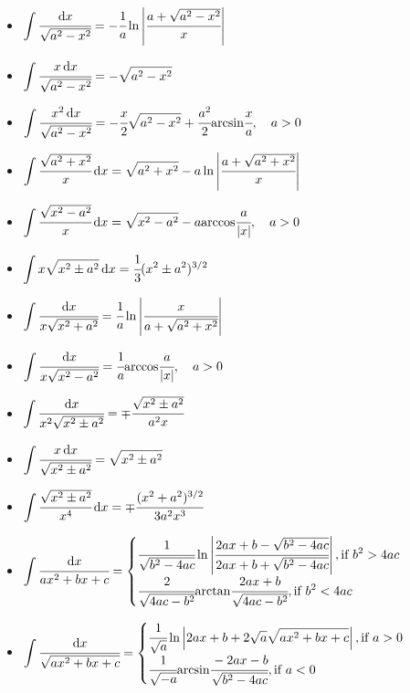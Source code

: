 \begin{itemize}
\item $ \displaystyle \int \cfrac{{ { \text{d} } x}}{\sqrt{a^2 - x^2}}= - \cfrac{1}{a} \ln\left\vert\cfrac{a + \sqrt{a^2 - x^2}}{x}\right\vert $
\item $ \displaystyle \int \cfrac{x \, { { \text{d} } x}}{\sqrt{a^2 - x^2}} = - \sqrt{a^2 - x^2} $
\item $ \displaystyle \int \cfrac{x^2 \, { { \text{d} } x}}{\sqrt{a^2 - x^2}} = - \cfrac{x}{2} \sqrt{a^2 - x^2} + \cfrac{a^2}{2} { \mathop{\text{arcsin}} } \cfrac{x}{a}, \quad a > 0 $
\item $ \displaystyle \int \cfrac{\sqrt{a^2 + x^2}}{x} \, { { \text{d} } x} = \sqrt{a^2 + x^2} - a \ln\left\vert\cfrac{a + \sqrt{a^2 + x^2}}{x}\right\vert $
\item $ \displaystyle \int \cfrac{\sqrt{x^2 - a^2}}{x} \, { { \text{d} } x} = \sqrt{x^2 - a^2} - a { \mathop{\text{arccos}} } \cfrac{a}{\vert x\vert} ,\quad a > 0 $
\item $ \displaystyle \int x \sqrt{x^2 \pm a^2} \, { { \text{d} } x} = \cfrac{1}{3} (x^2 \pm a^2)^{3/2} $
\item $ \displaystyle \int \cfrac{{ { \text{d} } x}}{x \sqrt{x^2 + a^2}} = \cfrac{1}{a} \ln \left\vert\cfrac{x}{a + \sqrt{a^2 + x^2}}\right\vert $

\item $ \displaystyle \int \cfrac{{ { \text{d} } x}}{x \sqrt{x^2 - a^2}} = \cfrac{1}{a} { \mathop{\text{arccos}} } \cfrac{a}{\vert x\vert} ,\quad a > 0 $
\item $ \displaystyle \int \cfrac{{ { \text{d} } x}}{x^2 \sqrt{x^2 \pm a^2}} = \mp \cfrac{\sqrt{x^2 \pm a^2}}{a^2 x} $
\item $ \displaystyle \int \cfrac{x \, { { \text{d} } x}}{\sqrt{x^2 \pm a^2}} = \sqrt{x^2 \pm a^2} $
\item $ \displaystyle \int \cfrac{\sqrt{x^2 \pm a^2}}{x^4} \, { { \text{d} } x} = \mp \cfrac{(x^2 + a^2)^{3/2}}{3a^2 x^3} $
\item $ \displaystyle \int \cfrac{{ { \text{d} } x}}{a x^2  + bx + c} = 
  \begin{cases}
  \displaystyle \cfrac{1}{\sqrt{b^2 -4ac}} \ln \left\vert\cfrac{ 2ax + b - \sqrt{b^2 -4ac}}{2ax + b + \sqrt{b^2 -4ac}}\right\vert, \text{if $b^2 > 4ac$} \\
  \displaystyle \cfrac{2}{\sqrt{4ac - b^2}} { \mathop{\text{arctan}} } \cfrac{ 2ax + b }{\sqrt{4ac - b^2}}, \text{if $b^2 < 4ac$}
  \end{cases}
$
\item $ \displaystyle \int \cfrac{{ { \text{d} } x}}{\sqrt{a x^2  + bx + c}}  =
  \begin{cases}
  \displaystyle \cfrac{1}{\sqrt{a}} \ln \left\vert 2ax + b + 2\sqrt{a} \sqrt{ax^2 + bx + c}\right\vert, \text{if $a > 0$} \\
  \displaystyle \cfrac{1}{\sqrt{- a}} { \mathop{\text{arcsin}} } \cfrac{-2ax - b}{\sqrt{b^2 - 4ac}}, \text{if $a < 0$}
  \end{cases}
$


\end{itemize}
